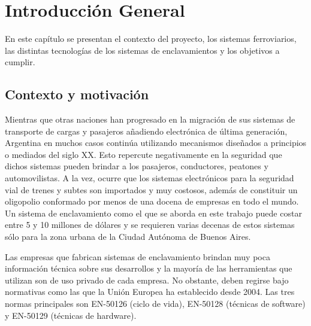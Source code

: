 
\chapter{Introducción General} %

\label{Chapter1} %
\label{IntroGeneral}


\newcommand{\keyword}[1]{\textbf{#1}}
\newcommand{\tabhead}[1]{\textbf{#1}}
\newcommand{\code}[1]{\texttt{#1}}
\newcommand{\file}[1]{\texttt{\bfseries#1}}
\newcommand{\option}[1]{\texttt{\itshape#1}}
\newcommand{\grados}{$^{\circ}$}


En este capítulo se presentan el contexto del proyecto, los sistemas ferroviarios, las distintas tecnologías de los sistemas de enclavamientos y los objetivos a cumplir.

		
	\section{Contexto y motivación}
	
		Mientras que otras naciones han progresado en la migración de sus sistemas de transporte de cargas y pasajeros añadiendo electrónica de última generación, Argentina en muchos casos continúa utilizando mecanismos diseñados a principios o mediados del siglo XX\cite{cite0,cite2}. Esto repercute negativamente en la seguridad que dichos sistemas pueden brindar a los pasajeros, conductores, peatones y automovilistas. A la vez, ocurre que los sistemas electrónicos para la seguridad vial de trenes y subtes son importados y muy costosos, además de constituir un oligopolio conformado por menos de una docena de empresas en todo el mundo. Un sistema de enclavamiento como el que se aborda en este trabajo puede costar entre 5 y 10 millones de dólares\citep{SIEMENS} y se requieren varias decenas de estos sistemas sólo para la zona urbana de la Ciudad Autónoma de Buenos Aires.
		
		Las empresas que fabrican sistemas de enclavamiento \cite{cite5,cite6,cite7,cite8,cite9,cite10,cite12,cite13,cite14,cite15} brindan muy poca información técnica sobre sus desarrollos y la mayoría de las herramientas que utilizan son de uso privado de cada empresa. No obstante, deben regirse bajo normativas como las que la Unión Europea ha establecido desde 2004. Las tres normas principales son EN-50126\cite{EN50126} (ciclo de vida), EN-50128\cite{EN50128} (técnicas de software) y EN-50129\cite{EN50129} (técnicas de hardware). %
		
